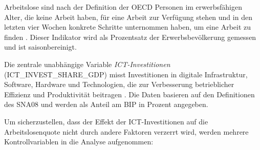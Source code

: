 Arbeitslose sind nach der Definition der \ac{OECD} Personen im erwerbsfähigen Alter, die keine 
Arbeit haben, für eine Arbeit zur Verfügung stehen und in den letzten vier Wochen konkrete 
Schritte unternommen haben, um eine Arbeit zu finden \parencite{oecd2022unemployment}. Dieser 
Indikator wird als Prozentsatz der Erwerbsbevölkerung gemessen und ist saisonbereinigt.

Die zentrale unabhängige Variable \textit{\ac{ICT}-Investitionen} (ICT\_INVEST\_SHARE\_GDP) 
misst Investitionen in digitale Infrastruktur, Software, Hardware und Technologien, die zur 
Verbesserung betrieblicher Effizienz und Produktivität beitragen \parencite{oecd2022ict}. Die 
Daten basieren auf den Definitionen des \ac{SNA08} und werden als Anteil am \ac{BIP} in Prozent 
angegeben.

Um sicherzustellen, dass der Effekt der \ac{ICT}-Investitionen auf die Arbeitslosenquote nicht 
durch andere Faktoren verzerrt wird, werden mehrere Kontrollvariablen in die Analyse aufgenommen:

